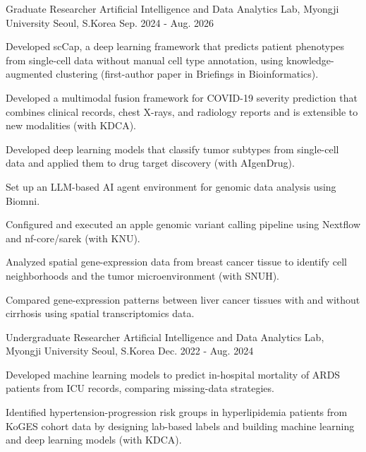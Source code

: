 \documentclass[11pt, a4paper]{awesome-cv}
\begin{document}
\begin{cventries}
\cventry
    {Graduate Researcher} %
    {Artificial Intelligence and Data Analytics Lab, Myongji University} %
    {Seoul, S.Korea} %
    {Sep. 2024 - Aug. 2026} %
    {
      \begin{cvitems}
        \item {Developed scCap, a deep learning framework that predicts patient phenotypes from single-cell data without manual cell type annotation, using knowledge-augmented clustering (first-author paper in Briefings in Bioinformatics).}
        \item {Developed a multimodal fusion framework for COVID-19 severity prediction that combines clinical records, chest X-rays, and radiology reports and is extensible to new modalities (with KDCA).}
        \item {Developed deep learning models that classify tumor subtypes from single-cell data and applied them to drug target discovery (with AIgenDrug).}
        \item {Set up an LLM-based AI agent environment for genomic data analysis using Biomni.}
        \item {Configured and executed an apple genomic variant calling pipeline using Nextflow and nf-core/sarek (with KNU).}
        \item {Analyzed spatial gene-expression data from breast cancer tissue to identify cell neighborhoods and the tumor microenvironment (with SNUH).}
        \item {Compared gene-expression patterns between liver cancer tissues with and without cirrhosis using spatial transcriptomics data.}
      \end{cvitems}
    }
\vspace{-1mm}
\cventry
    {Undergraduate Researcher} %
    {Artificial Intelligence and Data Analytics Lab, Myongji University} %
    {Seoul, S.Korea} %
    {Dec. 2022 - Aug. 2024} %
    {
      \begin{cvitems}
        \item {Developed machine learning models to predict in-hospital mortality of ARDS patients from ICU records, comparing missing-data strategies.}
        \item {Identified hypertension-progression risk groups in hyperlipidemia patients from KoGES cohort data by designing lab-based labels and building machine learning and deep learning models (with KDCA).}

\end{cvitems}}
\end{cventries}
\end{document}
